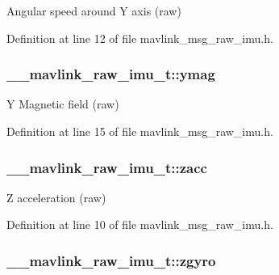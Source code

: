 Angular speed around Y axis (raw) 



Definition at line 12 of file mavlink\-\_\-msg\-\_\-raw\-\_\-imu.\-h.

\hypertarget{struct____mavlink__raw__imu__t_a813c4472362512205eb1035d67f80ff2}{
\subsubsection[{ymag}]{ \-\_\-\-\_\-mavlink\-\_\-raw\-\_\-imu\-\_\-t\-::ymag}}\label{struct____mavlink__raw__imu__t_a813c4472362512205eb1035d67f80ff2}


Y Magnetic field (raw) 



Definition at line 15 of file mavlink\-\_\-msg\-\_\-raw\-\_\-imu.\-h.

\hypertarget{struct____mavlink__raw__imu__t_a0c71dfe587d17f471e59ed5acd5691f8}{
\subsubsection[{zacc}]{ \-\_\-\-\_\-mavlink\-\_\-raw\-\_\-imu\-\_\-t\-::zacc}}\label{struct____mavlink__raw__imu__t_a0c71dfe587d17f471e59ed5acd5691f8}


Z acceleration (raw) 



Definition at line 10 of file mavlink\-\_\-msg\-\_\-raw\-\_\-imu.\-h.

\hypertarget{struct____mavlink__raw__imu__t_a42af4ae862faf80bb6754e09db7ca9fe}{
\subsubsection[{zgyro}]{ \-\_\-\-\_\-mavlink\-\_\-raw\-\_\-imu\-\_\-t\-::zgyro}}\label{struct____mavlink__raw__imu__t_a42af4ae862faf80bb6754e09db7ca9fe}


